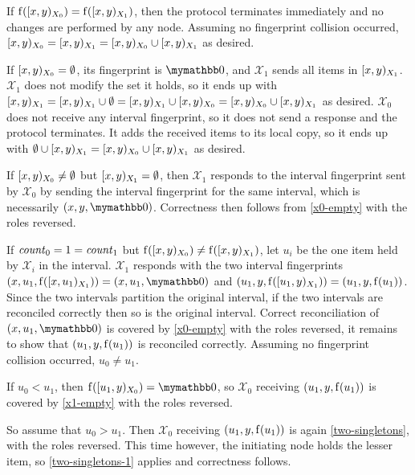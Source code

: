 \begin{caselist}
 \label{fingerprint-eq} If $\operatorname{f}([{x},{y})_{X_0}) = \operatorname{f}([{x},{y})_{X_1})$, then the protocol terminates immediately and no changes are performed by any node. Assuming no fingerprint collision occurred, $[{x},{y})_{X_0} = [{x},{y})_{X_1} = [{x},{y})_{X_0} \cup [{x},{y})_{X_1}$ as desired.

 \label{x0-empty} If $[{x},{y})_{X_0} = \emptyset$, its fingerprint is $\neutraladd$, and $\mathcal{X}_1$ sends all items in $[{x},{y})_{X_1}$. $\mathcal{X}_1$ does not modify the set it holds, so it ends up with $[{x},{y})_{X_1} = [{x},{y})_{X_1} \cup \emptyset = [{x},{y})_{X_1} \cup [{x},{y})_{X_0} = [{x},{y})_{X_0} \cup [{x},{y})_{X_1}$ as desired. $\mathcal{X}_0$ does not receive any interval fingerprint, so it does not send a response and the protocol terminates. It adds the received items to its local copy, so it ends up with $\emptyset \cup [{x},{y})_{X_1} = [{x},{y})_{X_0} \cup [{x},{y})_{X_1}$ as desired.

 \label{x1-empty} If $[{x},{y})_{X_0} \neq \emptyset$ but $[{x},{y})_{X_1} = \emptyset$, then $\mathcal{X}_1$ responds to the interval fingerprint sent by $\mathcal{X}_0$ by sending the interval fingerprint for the same interval, which is necessarily $\ifpmanual{x}{y}{\neutraladd}$. Correctness then follows from \cref{x0-empty} with the roles reversed.

 \label{two-singletons} If $\mathit{count}_{0} = 1 = \mathit{count}_{1}$ but $\operatorname{f}([{x},{y})_{X_0}) \neq \operatorname{f}([{x},{y})_{X_1})$, let $u_i$ be the one item held by $\mathcal{X}_i$ in the interval. $\mathcal{X}_1$ responds with the two interval fingerprints $\ifp{x}{u_1}{X_1} = \ifpmanual{x}{u_1}{\neutraladd}$ and $({u_1}, {y}, {\operatorname{f}([{u_1},{y})_{X_1})}) = ({u_1}, {y}, {\operatorname{f}(u_1)})$. Since the two intervals partition the original interval, if the two intervals are reconciled correctly then so is the original interval. Correct reconciliation of $\ifpmanual{x}{u_1}{\neutraladd}$ is covered by \cref{x0-empty} with the roles reversed, it remains to show that $({u_1}, {y}, {\operatorname{f}(u_1)})$ is reconciled correctly. Assuming no fingerprint collision occurred, $u_0 \neq u_1$.

\begin{caselist}
\case \label{two-singletons-1}  If $u_0 < u_1$, then $\fp{\interval{u_1}{y}{X_0}} = \neutraladd$, so $\mathcal{X}_0$ receiving $({u_1}, {y}, {\operatorname{f}(u_1)})$ is covered by \cref{x1-empty} with the roles reversed.

\case So assume that $u_0 > u_1$. Then $\mathcal{X}_0$ receiving $({u_1}, {y}, {\operatorname{f}(u_1)})$ is again \cref{two-singletons}, with the roles reversed. This time however, the initiating node holds the lesser item, so \cref{two-singletons-1} applies and correctness follows.
\end{caselist}
\end{caselist}

